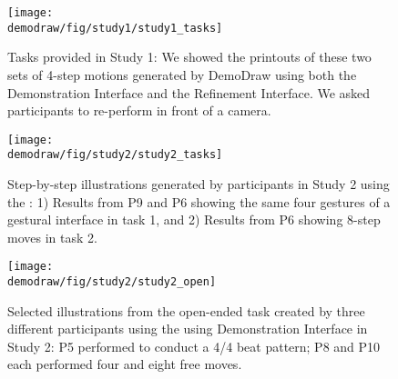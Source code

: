 \begin{appendices}

\renewcommand\thefigure{A.\arabic{figure}}
\setcounter{figure}{0}



\clearpage

\begin{figure}
   \begin{minipage}[b]{1.0\textwidth}
     \centering
    \texttt{[image: \\demodraw/fig/study1/study1\_tasks]}
    \caption{Tasks provided in Study 1: We showed the printouts of these two sets of 4-step motions generated by DemoDraw using both the Demonstration Interface and the Refinement Interface. We asked participants to re-perform in front of a camera.}
    \label{fig:study_review_tasks}
   \end{minipage}

   \vspace{6mm}
   \begin{minipage}[b]{1.0\textwidth}
     \centering
    \texttt{[image: \\demodraw/fig/study2/study2\_tasks]}
    \caption{Step-by-step illustrations generated by participants in Study 2 using the \phaseI{}: 1) Results from P9 and P6 showing the same four gestures of a gestural interface in task 1, and 2) Results from P6 showing 8-step moves in task 2.}
    \label{fig:study_authoring_tasks}
   \end{minipage}

   \vspace{6mm}
   \begin{minipage}[b]{1.0\textwidth}
     \centering
    \texttt{[image: \\demodraw/fig/study2/study2\_open]}
    \caption{Selected illustrations from the open-ended task created by three different participants using the using Demonstration Interface in Study 2: P5 performed to conduct a 4/4 beat pattern; P8 and P10 each performed four and eight free moves.}
    \label{fig:open_ended_examples}
   \end{minipage}
 \end{figure}

\end{appendices}
